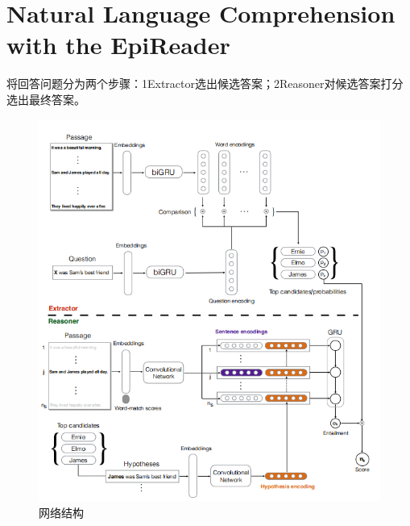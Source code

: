 \documentclass[a4paper,UTF8]{article}
\numberwithin{equation}{section}
\begin{document}
\section{Natural Language Comprehension with the EpiReader}
将回答问题分为两个步骤：1Extractor选出候选答案；2Reasoner对候选答案打分选出最终答案。
\begin{figure}[H]
    \centering
    \includegraphics[width=\textwidth]{11-1.png}
    \caption{网络结构}
\end{figure}
\end{document}
